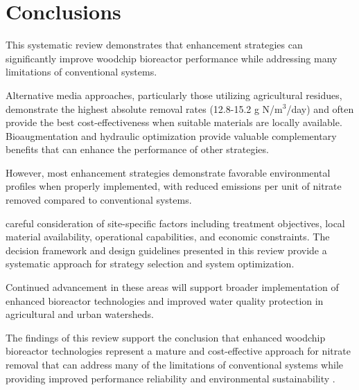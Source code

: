 \documentclass[12pt,a4paper]{article}
\begin{document}
\section{Conclusions}

This systematic review demonstrates that enhancement strategies can significantly improve woodchip bioreactor performance while addressing many limitations of conventional systems. 

Alternative media approaches, particularly those utilizing agricultural residues, demonstrate the highest absolute removal rates (12.8-15.2 g N/m$^3$/day) and often provide the best cost-effectiveness when suitable materials are locally available.  Bioaugmentation and hydraulic optimization provide valuable complementary benefits that can enhance the performance of other strategies.

 However, most enhancement strategies demonstrate favorable environmental profiles when properly implemented, with reduced emissions per unit of nitrate removed compared to conventional systems.

 careful consideration of site-specific factors including treatment objectives, local material availability, operational capabilities, and economic constraints. The decision framework and design guidelines presented in this review provide a systematic approach for strategy selection and system optimization.

 Continued advancement in these areas will support broader implementation of enhanced bioreactor technologies and improved water quality protection in agricultural and urban watersheds.

The findings of this review support the conclusion that enhanced woodchip bioreactor technologies represent a mature and cost-effective approach for nitrate removal that can address many of the limitations of conventional systems while providing improved performance reliability and environmental sustainability \citep{RN625, RN310}.

\clearpage

% 
% 
\end{document}
